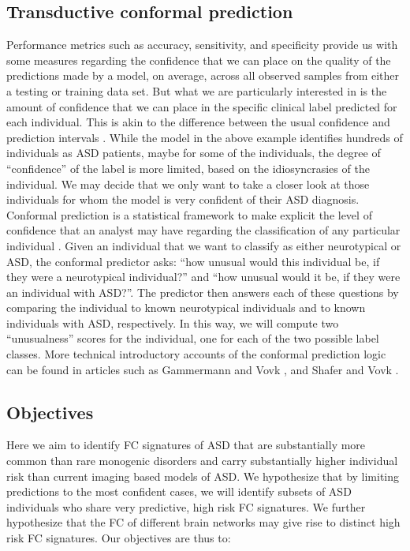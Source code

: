 \documentclass[9pt,lineno]{elife}
\begin{document}
\subsection{Transductive conformal prediction}
Performance metrics such as accuracy, sensitivity, and specificity provide us with some measures regarding the confidence that we can place on the quality of the predictions made by a model, on average, across all observed samples from either a testing or training data set. But what we are particularly interested in is the amount of confidence that we can place in the specific clinical label predicted for each individual. This is akin to the difference between the usual confidence  and prediction intervals \citep{Kummel2018-tm}. While the model in the above example identifies hundreds of individuals as ASD patients, maybe for some of the individuals, the degree of “confidence” of the label is more limited, based on the idiosyncrasies of the individual. We may decide that we only want to take a closer look at those individuals for whom the model is very confident of their ASD diagnosis. Conformal prediction is a statistical framework to make explicit the level of confidence that an analyst may have regarding the classification of any particular individual \citep{Vovk2005-uc}. Given an individual that we want to classify as either neurotypical or ASD, the conformal predictor asks: “how unusual would this individual be, if they were a neurotypical individual?” and “how unusual would it be, if they were an individual with ASD?”. The predictor then answers each of these questions by comparing the individual to known neurotypical individuals and to known individuals with ASD, respectively. In this way, we will compute two “unusualness” scores for the individual, one for each of the two possible label classes. More technical introductory accounts of the conformal prediction logic can be found in articles such as Gammermann and Vovk \citep{Gammerman2007-iu}, and Shafer and Vovk \citep{Shafer2008-lf}.

\subsection{Objectives}
Here we aim to identify FC signatures of ASD that are substantially more common than rare monogenic disorders and carry substantially higher individual risk than current imaging based models of ASD. We hypothesize that by limiting predictions to the most confident cases, we will identify subsets of ASD individuals who share very predictive, high risk FC signatures. We further hypothesize that the FC of different brain networks may give rise to distinct high risk FC signatures. Our objectives are thus to:
\end{document}
